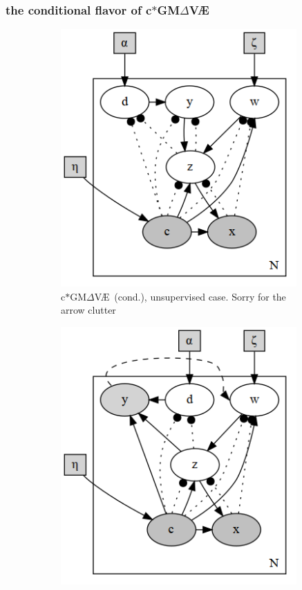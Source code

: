 \documentclass[final]{beamer}
\newcommand{\gmvae}{c$\ast$GM$\Delta$V\AE~}
\begin{document}
\begin{frame}
\frametitle{the conditional flavor of \gmvae}
\begin{figure}[h]
\centering
\begin{subfigure}[b]{0.45\textwidth}
\includegraphics[width=0.99\textwidth]{plots/dirichlet_gmm_cvae.v2.gv.png}
\caption{\gmvae (cond.), unsupervised case. Sorry for the arrow clutter}
\label{fig:dirgmmcvae}
\end{subfigure}
\begin{subfigure}[b]{0.45\textwidth}
\includegraphics[width=0.99\textwidth]{plots/dirichlet_gmm_cvae_supervised.v2.gv.png}

\end{subfigure}
\end{figure}
\end{frame}
\end{document}

